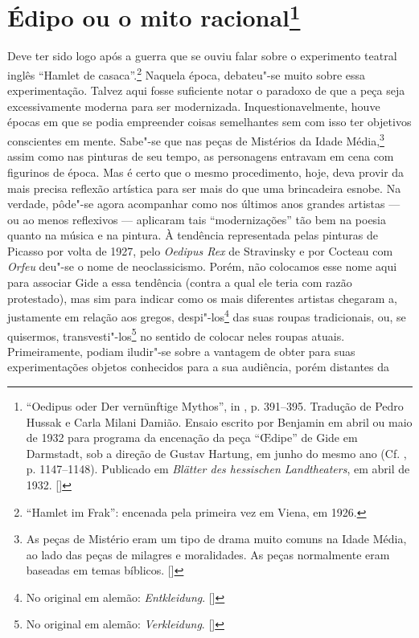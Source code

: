 \chapter{Édipo ou o mito racional\footnote[*]{``Oedipus oder Der vernünftige Mythos'', in , p. 391--395. Tradução de
  Pedro Hussak e Carla Milani Damião. Ensaio escrito
  por Benjamin em abril ou maio de 1932 para programa da encenação da
  peça ``\OE dipe'' de Gide em Darmstadt, sob a direção de Gustav Hartung,
  em junho do mesmo ano (Cf. , p. 1147--1148). Publicado em
  \emph{Blätter des hessischen Landtheaters}, em abril de 1932. []}}

Deve ter sido logo após a guerra que se ouviu falar sobre o experimento
teatral inglês ``Hamlet de casaca''.\footnote{``Hamlet im Frak'':
  encenada pela primeira vez em Viena, em 1926. \versal{[N.~O.]}} Naquela época,
debateu"-se muito sobre essa experimentação. Talvez aqui fosse suficiente
notar o paradoxo de que a peça seja excessivamente moderna para ser
modernizada. Inquestionavelmente, houve épocas em que se podia
empreender coisas semelhantes sem com isso ter objetivos conscientes em mente.
Sabe"-se que nas peças de Mistérios da Idade Média,\footnote{As peças de Mistério eram um tipo de drama muito comuns na Idade Média, ao lado das peças de milagres e moralidades. As peças normalmente eram baseadas em temas bíblicos. []} assim como nas
pinturas de seu tempo, as personagens entravam em cena com figurinos de
época. Mas é certo que o mesmo procedimento, hoje, deva provir da mais
precisa reflexão artística para ser mais do que uma brincadeira esnobe.
Na verdade, pôde"-se agora acompanhar como nos últimos anos grandes
artistas --- ou ao menos reflexivos --- aplicaram tais ``modernizações''
tão bem na poesia quanto na música e na pintura. À tendência
representada pelas pinturas de Picasso por volta de 1927, pelo
\emph{Oedipus Rex} de Stravinsky e por Cocteau com \emph{Orfeu} deu"-se o
nome de neoclassicismo. Porém, não colocamos esse nome aqui para
associar Gide a essa tendência (contra a qual ele teria com razão
protestado), mas sim para indicar como os mais diferentes artistas
chegaram a, justamente em relação aos gregos, despi"-los\footnote{No original em alemão: \emph{Entkleidung}. []} das suas roupas tradicionais, ou, se quisermos, transvesti"-los\footnote{No original em alemão: \emph{Verkleidung}. []} no sentido de colocar neles roupas atuais.
Primeiramente, podiam iludir"-se sobre a vantagem de
obter para suas experimentações objetos conhecidos para a sua audiência, porém distantes da

